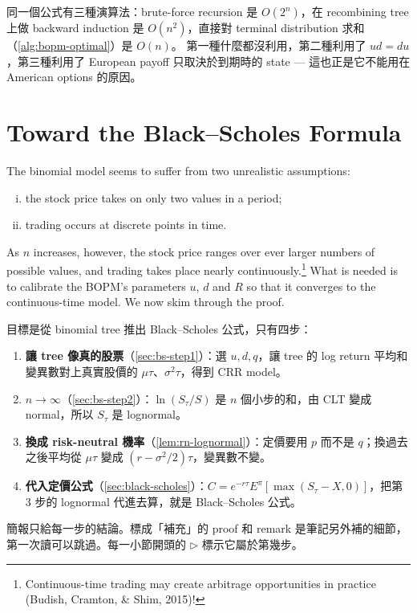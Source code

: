 \suppstart
\begin{moral}
	同一個公式有三種演算法：brute-force recursion 是 $O(2^{n})$，在 recombining tree 上做 backward induction 是 $O(n^{2})$，直接對 terminal distribution 求和（\autoref{alg:bopm-optimal}）是 $O(n)$。
	第一種什麼都沒利用，第二種利用了 $ud=du$，第三種利用了 European payoff 只取決於到期時的 state --- 這也正是它不能用在 American options 的原因。
\end{moral}
\suppend

\section{Toward the Black--Scholes Formula}
\label{sec:toward-bs}


The binomial model seems to suffer from two unrealistic assumptions:
\begin{enumerate}[(i), nosep]
	\item the stock price takes on only two values in a period;
	\item trading occurs at discrete points in time.
\end{enumerate}
As $n$ increases, however, the stock price ranges over ever larger numbers of possible values, and trading takes place nearly continuously.\footnote{Continuous-time trading may create arbitrage opportunities in practice (Budish, Cramton, \& Shim, 2015)!}
What is needed is to calibrate the BOPM's parameters $u$, $d$ and $R$ so that it converges to the continuous-time model.
We now skim through the proof.

\suppstart
\begin{remark}[路線圖]
	目標是從 binomial tree 推出 Black--Scholes 公式，只有四步：
	\begin{enumerate}[(1),nosep]
		\item \textbf{讓 tree 像真的股票}（\autoref{sec:bs-step1}）：選 $u,d,q$，讓 tree 的 log return 平均和變異數對上真實股價的 $\mu\tau$、$\sigma^{2}\tau$，得到 CRR model。
		\item \textbf{$n\to\infty$}（\autoref{sec:bs-step2}）：$\ln(S_{\tau}/S)$ 是 $n$ 個小步的和，由 CLT 變成 normal，所以 $S_{\tau}$ 是 lognormal。
		\item \textbf{換成 risk-neutral 機率}（\autoref{lem:rn-lognormal}）：定價要用 $p$ 而不是 $q$；換過去之後平均從 $\mu\tau$ 變成 $(r-\sigma^{2}/2)\tau$，變異數不變。
		\item \textbf{代入定價公式}（\autoref{sec:black-scholes}）：$C=e^{-r\tau}E^{\pi}[\max(S_{\tau}-X,0)]$，把第 3 步的 lognormal 代進去算，就是 Black--Scholes 公式。
	\end{enumerate}
	簡報只給每一步的結論。標成「補充」的 proof 和 remark 是筆記另外補的細節，第一次讀可以跳過。每一小節開頭的 $\triangleright$ 標示它屬於第幾步。
\end{remark}
\suppend

